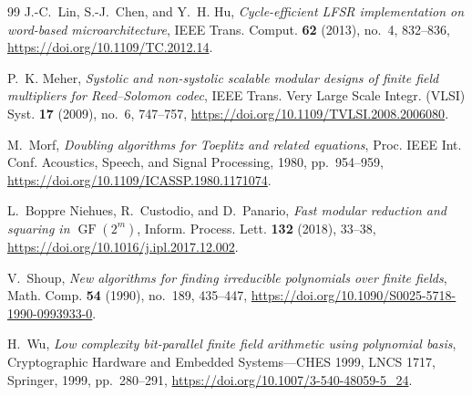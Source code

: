 \documentclass{mcom-l}
\numberwithin{equation}{section}
\theoremstyle{definition}
\theoremstyle{remark}
\begin{document}
\begin{thebibliography}{99}
J.-C.~Lin, S.-J.~Chen, and Y.~H. Hu, \emph{Cycle-efficient LFSR
implementation on word-based microarchitecture}, IEEE Trans. Comput.
\textbf{62} (2013), no.~4, 832--836,
\url{https://doi.org/10.1109/TC.2012.14}.

P.~K. Meher, \emph{Systolic and non-systolic scalable modular designs of
finite field multipliers for Reed--Solomon codec}, IEEE Trans. Very Large
Scale Integr. (VLSI) Syst. \textbf{17} (2009), no.~6, 747--757,
\url{https://doi.org/10.1109/TVLSI.2008.2006080}.

M.~Morf, \emph{Doubling algorithms for Toeplitz and related equations},
Proc. IEEE Int. Conf. Acoustics, Speech, and Signal Processing, 1980,
pp.~954--959, \url{https://doi.org/10.1109/ICASSP.1980.1171074}.

L.~Boppre Niehues, R.~Custodio, and D.~Panario, \emph{Fast modular reduction
and squaring in $\operatorname{GF}(2^m)$}, Inform. Process. Lett.
\textbf{132} (2018), 33--38,
\url{https://doi.org/10.1016/j.ipl.2017.12.002}.

V.~Shoup, \emph{New algorithms for finding irreducible polynomials over finite
fields}, Math. Comp. \textbf{54} (1990), no.~189, 435--447,
\url{https://doi.org/10.1090/S0025-5718-1990-0993933-0}.

H.~Wu, \emph{Low complexity bit-parallel finite field arithmetic using
polynomial basis}, Cryptographic Hardware and Embedded Systems---CHES 1999,
LNCS 1717, Springer, 1999, pp.~280--291,
\url{https://doi.org/10.1007/3-540-48059-5_24}.
\end{thebibliography}
\end{document}
